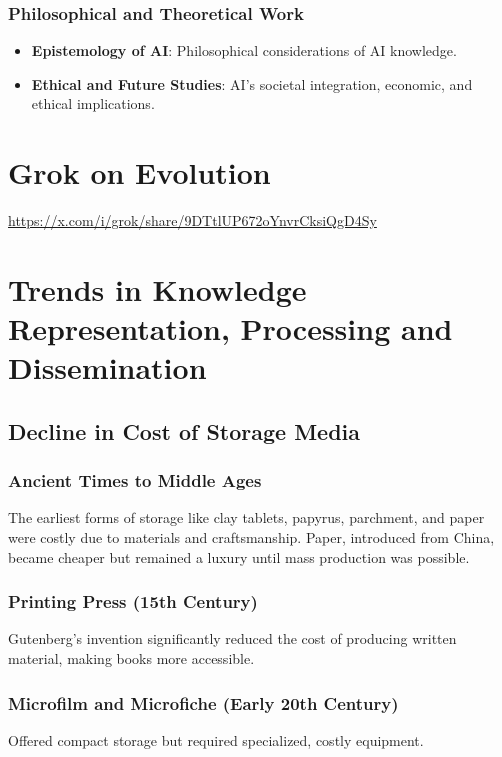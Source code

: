 \documentclass[12pt,titlepage]{book}
\begin{document}
\subsection{Philosophical and Theoretical Work}

\begin{itemize}
    \item \textbf{Epistemology of AI}: Philosophical considerations of AI knowledge.
    \item \textbf{Ethical and Future Studies}: AI's societal integration, economic, and ethical implications.
\end{itemize}

\chapter{Grok on Evolution}

\url{https://x.com/i/grok/share/9DTtlUP672oYnvrCksiQgD4Sy}

\chapter{Trends in Knowledge Representation, Processing and Dissemination}

\section{Decline in Cost of Storage Media}

\subsection{Ancient Times to Middle Ages}
The earliest forms of storage like clay tablets, papyrus, parchment, and paper were costly due to materials and craftsmanship. Paper, introduced from China, became cheaper but remained a luxury until mass production was possible.

\subsection{Printing Press (15th Century)}
Gutenberg's invention significantly reduced the cost of producing written material, making books more accessible.

\subsection{Microfilm and Microfiche (Early 20th Century)}
Offered compact storage but required specialized, costly equipment.
\end{document}
